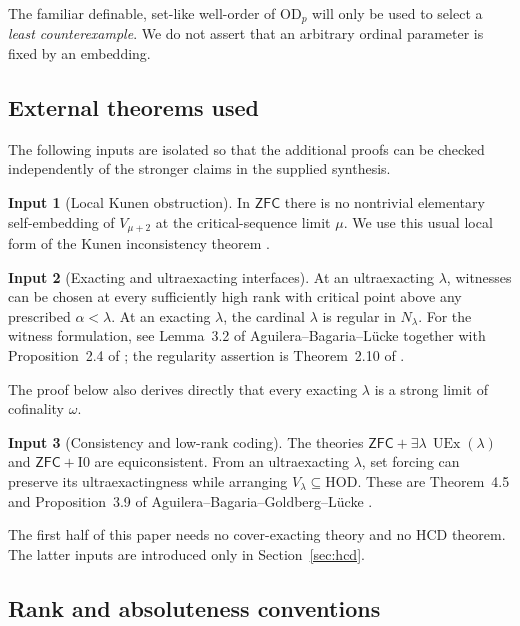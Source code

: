 \documentclass[11pt,letterpaper]{article}
\theoremstyle{definition}
\newtheorem{inputthm}{Input}
\numberwithin{equation}{section}
\newcommand{\ZFC}{\mathsf{ZFC}}
\newcommand{\HOD}{\mathrm{HOD}}
\newcommand{\OD}{\mathrm{OD}}
\newcommand{\HCD}{\mathrm{HCD}}
\newcommand{\UEx}{\operatorname{UEx}}
\newcommand{\Izero}{\mathrm{I0}}
\newcommand{\Nlam}{N_\lambda}
\begin{document}
The familiar definable, set-like well-order of $\OD_p$ will only be used to select a \emph{least counterexample}. We do not assert that an arbitrary ordinal parameter is fixed by an embedding.

\subsection{External theorems used}

The following inputs are isolated so that the additional proofs can be checked independently of the stronger claims in the supplied synthesis.

\begin{inputthm}[Local Kunen obstruction]\label{in:local}
In $\ZFC$ there is no nontrivial elementary self-embedding of $V_{\mu+2}$ at the critical-sequence limit $\mu$. We use this usual local form of the Kunen inconsistency theorem \cite{kunen,hkp}.
\end{inputthm}

\begin{inputthm}[Exacting and ultraexacting interfaces]\label{in:exacting}
At an ultraexacting $\lambda$, witnesses can be chosen at every sufficiently high rank with critical point above any prescribed $\alpha<\lambda$. At an exacting $\lambda$, the cardinal $\lambda$ is regular in $\Nlam$. For the witness formulation, see Lemma~3.2 of Aguilera--Bagaria--L\"ucke \cite{abl} together with Proposition~2.4 of \cite{abgl}; the regularity assertion is Theorem~2.10 of \cite{abl}.
\end{inputthm}

The proof below also derives directly that every exacting $\lambda$ is a strong limit of cofinality $\omega$.

\begin{inputthm}[Consistency and low-rank coding]\label{in:abgl}
The theories $\ZFC+\exists\lambda\,\UEx(\lambda)$ and $\ZFC+\Izero$ are equiconsistent. From an ultraexacting $\lambda$, set forcing can preserve its ultraexactingness while arranging $V_\lambda\subseteq\HOD$. These are Theorem~4.5 and Proposition~3.9 of Aguilera--Bagaria--Goldberg--L\"ucke \cite{abgl}.
\end{inputthm}

The first half of this paper needs no cover-exacting theory and no $\HCD$ theorem. The latter inputs are introduced only in Section~\ref{sec:hcd}.

\subsection{Rank and absoluteness conventions}
\end{document}
